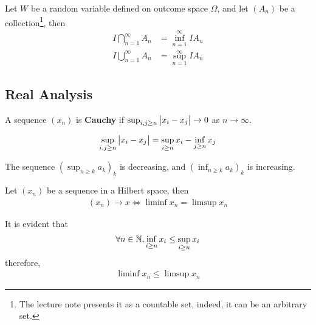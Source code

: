 \documentclass{article}
\begin{document}
	\begin{proposition}
		Let $W$ be a random variable defined on outcome space $\Omega$, and let $(A_n)$ be a collection\footnote{The lecture note presents it as a countable set, indeed, it can be an arbitrary set.}, then
		\begin{align}
			I\bigcap_{n=1}^\infty A_n &= \inf_{n=1}^\infty I A_n \\
			I\bigcup_{n=1}^\infty A_n &= \sup_{n=1}^\infty I A_n
		\end{align}
	\end{proposition}

	\subsection{Real Analysis}
	\begin{definition}
		A sequence $(x_n)$ is \textbf{Cauchy} if $\sup_{i, j \geq n} \big \vert {x_i - x_j} \big \vert \to 0$ as $n \to \infty$.
	\end{definition}
	
	\begin{proposition}
		\begin{align}
			\sup_{i, j \geq n} \big \vert {x_i - x_j} \big \vert = \sup_{i \geq n} x_i - \inf_{j \geq n} x_j
		\end{align}
	\end{proposition}
	
	\begin{proposition}
		The sequence $(\sup_{n \geq k} a_k)_k$ is decreasing, and $(\inf_{n \geq k} a_k)_k$ is increasing.
	\end{proposition}

	\begin{theorem}
		Let $(x_n)$ be a sequence in a Hilbert space, then 
		\begin{align}
			(x_n) \to x \iff \liminf x_n = \limsup x_n
		\end{align}
	\end{theorem}
	
	\begin{proposition}
	It is evident that
	\begin{align}
		\forall n \in \mathbb{N}, \inf_{i\geq n} x_i \leq \sup_{i \geq n} x_i	
	\end{align}
	therefore, 
	\begin{align}
		\liminf x_n \leq \limsup x_n
	\end{align}
	\end{proposition}
\end{document}
